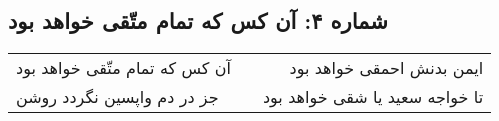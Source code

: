 \begin{center}
\section*{شماره ۴: آن کس که تمام متّقی خواهد بود}
\label{sec:004}
\begin{longtable}{l p{0.5cm} r}
آن کس که تمام متّقی خواهد بود
&&
ایمن بدنش احمقی خواهد بود
\\
جز در دم واپسین نگردد روشن
&&
تا خواجه سعید یا شقی خواهد بود
\\
\end{longtable}
\end{center}
